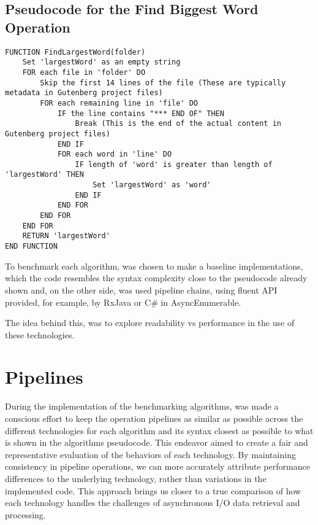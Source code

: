 \clearpage

\subsection*{Pseudocode for the Find Biggest Word Operation}
\begin{lstlisting}[language={}, caption={Pseudocode for FindLargestWord function}, label={lst:findlargestword}]
FUNCTION FindLargestWord(folder)
    Set 'largestWord' as an empty string
    FOR each file in 'folder' DO
        Skip the first 14 lines of the file (These are typically metadata in Gutenberg project files)
        FOR each remaining line in 'file' DO
            IF the line contains "*** END OF" THEN
                Break (This is the end of the actual content in Gutenberg project files)
            END IF
            FOR each word in 'line' DO
                IF length of 'word' is greater than length of 'largestWord' THEN
                    Set 'largestWord' as 'word'
                END IF
            END FOR
        END FOR
    END FOR
    RETURN 'largestWord'
END FUNCTION
\end{lstlisting}

To benchmark each algorithm, was chosen to make a baseline implementations, which the code resembles the syntax complexity close to the pseudocode already shown and, on the other side, was used pipeline chains, using fluent API provided, for example, by RxJava or C\# in AsyncEnumerable.

The idea behind this, was to explore readability vs performance in the use of these technologies.


\section{Pipelines}
\label{sec:pipeline_implementations}

During the implementation of the benchmarking algorithms, was made a conscious effort to keep the operation pipelines as similar as possible across the different technologies for each algorithm and its syntax closest as possible to what is shown in the algorithms pseudocode. This endeavor aimed to create a fair and representative evaluation of the behaviors of each technology. By maintaining consistency in pipeline operations, we can more accurately attribute performance differences to the underlying technology, rather than variations in the implemented code. This approach brings us closer to a true comparison of how each technology handles the challenges of asynchronous I/O data retrieval and processing.

